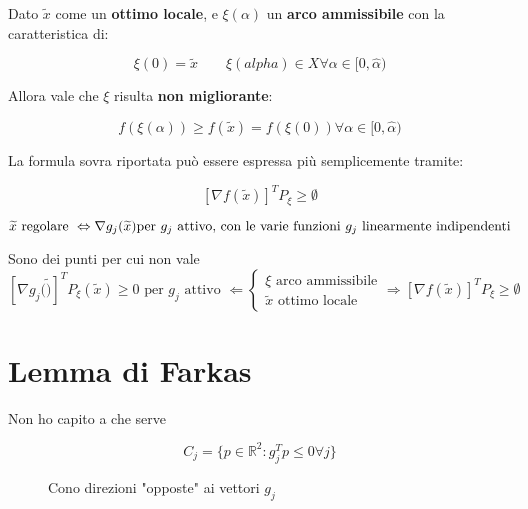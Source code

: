 \documentclass[\main/main.tex]{subfiles}
\begin{document}
Dato $\widetilde{x}$ come un \textbf{ottimo locale}, e $\xi(\alpha)$ un \textbf{arco ammissibile} con la caratteristica di:

\[
	\xi(0) = \widetilde{x} \qquad
	\xi(alpha) \in X \forall \alpha \in [0, \widehat{\alpha})
\]

Allora vale che $\xi$ risulta \textbf{non migliorante}:

\[
	f(\xi(\alpha)) \geq f(\widetilde{x}) = f(\xi(0)) \forall \alpha \in [0, \widehat{\alpha})
\]

La formula sovra riportata può essere espressa più semplicemente tramite:

\[
	[\nabla f(\widetilde{x})]^T P_{\xi} \geq \emptyset
\]

\begin{definition}
\[
	\widetilde{x} \text{ regolare } \Leftrightarrow \nabla g_j (\widetilde{x}) \text{per $ g_j$ attivo, con le varie funzioni $g_j$ linearmente indipendenti}
\]
\end{definition}

\begin{definition}
Sono dei punti per cui non vale 
	\[
		[\nabla g_j (\widetilde)]^T P_\xi (\widetilde{x}) \geq 0 \text{ per $g_j$ attivo } \Leftarrow 	\begin{cases}
				\xi \text{ arco ammissibile}\\
				\widetilde{x} \text{ ottimo locale}
		\end{cases}
		\Rightarrow
		[\nabla f(\widetilde{x})]^T P_{\xi} \geq \emptyset
	\]
\end{definition}

\begin{center}
\end{center}

\section{Lemma di Farkas}
Non ho capito a che serve

\begin{figure}[H]
\[
	C_j = \{ p \in \mathbb{R}^2: g_j^T p \leq 0 \forall j \} 
\]
\caption{Cono direzioni "opposte" ai vettori $g_j$}
\end{figure}
\end{document}
